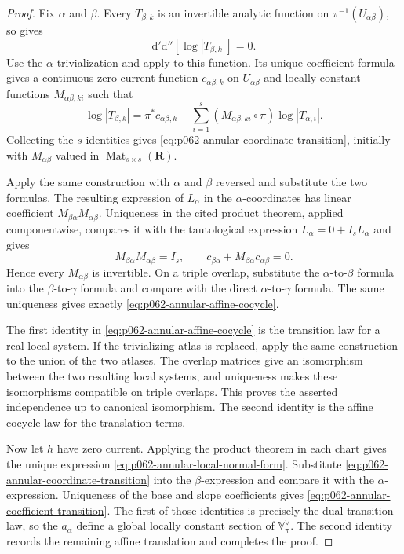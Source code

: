 \begin{proof}
Fix $\alpha$ and $\beta$.  Every $T_{\beta,k}$ is an invertible analytic
function on $\pi^{-1}(U_{\alpha\beta})$, so
 gives
\[
 \mathrm d'\mathrm d''[\log|T_{\beta,k}|]=0.
\]
Use the $\alpha$-trivialization and apply
 to this function.
Its unique coefficient formula gives a continuous zero-current function
$c_{\alpha\beta,k}$ on $U_{\alpha\beta}$ and locally constant functions
$M_{\alpha\beta,ki}$ such that
\[
 \log|T_{\beta,k}|
 =\pi^*c_{\alpha\beta,k}
  +\sum_{i=1}^s(M_{\alpha\beta,ki}\circ\pi)
                      \log|T_{\alpha,i}|.
\]
Collecting the $s$ identities gives
\eqref{eq:p062-annular-coordinate-transition}, initially with
$M_{\alpha\beta}$ valued in $\operatorname{Mat}_{s\times s}(\mathbf R)$.

Apply the same construction with $\alpha$ and $\beta$ reversed and
substitute the two formulas.  The resulting expression of $L_\alpha$ in
the $\alpha$-coordinates has linear coefficient
$M_{\beta\alpha}M_{\alpha\beta}$.  Uniqueness in the cited product theorem,
applied componentwise, compares it with the tautological expression
$L_\alpha=0+I_sL_\alpha$ and gives
\[
 M_{\beta\alpha}M_{\alpha\beta}=I_s,
 \qquad
 c_{\beta\alpha}+M_{\beta\alpha}c_{\alpha\beta}=0.
\]
Hence every $M_{\alpha\beta}$ is invertible.  On a triple overlap,
substitute the $\alpha$-to-$\beta$ formula into the
$\beta$-to-$\gamma$ formula and compare with the direct
$\alpha$-to-$\gamma$ formula.  The same uniqueness gives exactly
\eqref{eq:p062-annular-affine-cocycle}.

The first identity in \eqref{eq:p062-annular-affine-cocycle} is the
transition law for a real local system.  If the trivializing atlas is
replaced, apply the same construction to the union of the two atlases.
The overlap matrices give an isomorphism between the two resulting local
systems, and uniqueness makes these isomorphisms compatible on triple
overlaps.  This proves the asserted independence up to canonical
isomorphism.  The second identity is the affine cocycle law for the
translation terms.

Now let $h$ have zero current.  Applying the product theorem in each chart
gives the unique expression \eqref{eq:p062-annular-local-normal-form}.
Substitute \eqref{eq:p062-annular-coordinate-transition} into the
$\beta$-expression and compare it with the $\alpha$-expression.  Uniqueness
of the base and slope coefficients gives
\eqref{eq:p062-annular-coefficient-transition}.  The first of those
identities is precisely the dual transition law, so the $a_\alpha$ define
a global locally constant section of $\mathbb{V}_\pi^\vee$.  The second
identity records the remaining affine translation and completes the proof.
\end{proof}
